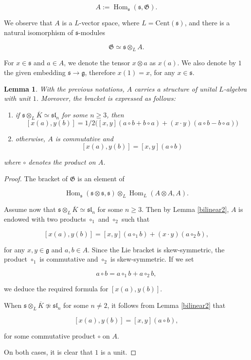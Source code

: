 \documentclass[11pt, letterpaper, reqno]{amsart}
\newtheorem{lemma}[theorem]{Lemma}
\theoremstyle{definition}
\newcommand{\Hom}{\operatorname{Hom}}
\newcommand{\fsl}{\mathfrak{sl}}
\newcommand{\fg}{\mathfrak{g}}
\newcommand{\fs}{\mathfrak{s}}
\newcommand{\fG}{\mathfrak{G}}
\newcommand{\Cent}{\mathrm{Cent}}
\begin{document}
$$A:=\Hom_\fs(\fs,\fG).$$ 

We observe that $A$ is a $L$-vector space,
where $L=\Cent(\fs)$, and there is a natural isomorphism of $\fs$-modules

$$\fG\simeq \fs\otimes_L A.$$

\noindent For $x\in\fs$ and $a\in A$, we denote the tensor $x\otimes a$ as $x(a)$. We also denote by $1$ the given embedding $\fs\to\fg$,
therefore $x(1)=x$, for any $x\in \fs$.

\begin{lemma}\label{aff} With the previous notations,
$A$ carries a structure of  unital $L$-algebra
with unit $1$. Moreover,  
 the bracket is expressed as follows:
\begin{enumerate}
\item[(a)] if $\fs\otimes_L \overline{K}
\simeq \fsl_n$ for some $n\geq 3$, then
$$[x(a),y(b)]=1/2\big([x,y](a\circ b+b\circ a)
+(x\cdot y)(a\circ b-b\circ a)\big)$$

\item[(b)] otherwise, $A$ is commutative and
$$[x(a),y(b)]=[x,y](a\circ b)$$
\end{enumerate}

\noindent where $\circ$ denotes the product on $A$.
\end{lemma}

\begin{proof} The bracket of $\fG$ is an
element of

$$\Hom_\fs(\fs\otimes\fs,\fs)
\otimes_L \Hom_L(A\otimes A, A).$$  

\noindent Assume now that  
$\fs\otimes_L \overline{K}
\simeq \fsl_n$ for some $n\geq 3$. Then 
by Lemma \ref{bilinear2},
$A$ is endowed with two products $\circ_1$ and
$\circ_2$ such that

$$[x(a),y(b)]=[x,y](a\circ_1 b)+
(x\cdot y)(a\circ_2 b),$$

\noindent for any $x,y\in\fg$ and $a,b\in A$.
Since the Lie bracket is skew-symmetric,
the product $\circ_1$ is commutative and 
$\circ_2$ is skew-symmetric. If we set

$$a\circ b= a\circ_1 b+a\circ_2 b,$$

\noindent we deduce the required formula for
$[x(a),y(b)]$.

When $\fs\otimes_L \overline{K}
\not\simeq \fsl_n$ for some $n\neq 2$,
it follows from Lemma \ref{bilinear2} that

 $$[x(a),y(b)]=[x,y](a\circ b),$$

\noindent for some commutative product $\circ$ on $A$.

On both cases, it is clear that $1$ is a unit.
\end{proof}
\end{document}
